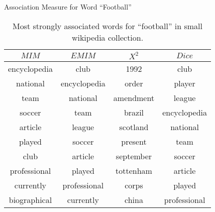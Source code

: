 \begin{table}[!htbp]
	\caption{Association Measure for Word ``Football''} \label{tab:football}
	\begin{center}
	\vspace{-5mm}
		\begin{tabular}{ c | c | c | c }
			\toprule
			$MIM$ & $EMIM$ & $X^2$ & $Dice$\\
			\midrule
encyclopedia  &  club         &   1992       &     club         \\  
national      &  encyclopedia &   order      &     player       \\  
team          &  national     &   amendment  &     league        \\ 
soccer        &  team         &   brazil     &     encyclopedia  \\ 
article       &  league       &   scotland   &     national      \\ 
played        &  soccer       &   present    &     team          \\ 
club          &  article      &   september  &     soccer        \\ 
professional  &  played       &   tottenham  &     article       \\ 
currently     &  professional &   corps      &     played        \\ 
biographical  &  currently    &   china      &     professional\\ 
			\bottomrule
		\end{tabular}
	\caption*{\scriptsize Most strongly associated words for ``football'' in small wikipedia collection.}
	 \end{center}
\end{table}

